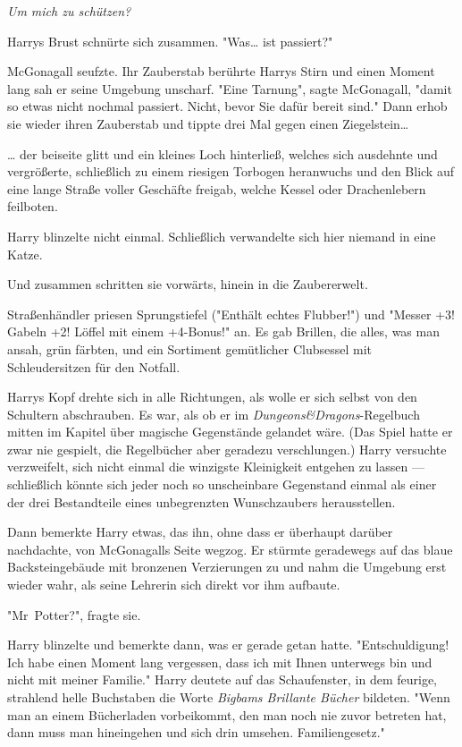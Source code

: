 {\emph{Um mich zu schützen?}

Harrys Brust schnürte sich zusammen. "Was… ist passiert?"

McGonagall seufzte. Ihr Zauberstab berührte Harrys Stirn und einen Moment lang sah er seine Umgebung unscharf. "Eine Tarnung", sagte McGonagall, "damit so etwas nicht nochmal passiert. Nicht, bevor Sie dafür bereit sind." Dann erhob sie wieder ihren Zauberstab und tippte drei Mal gegen einen Ziegelstein…

… der beiseite glitt und ein kleines Loch hinterließ, welches sich ausdehnte und vergrößerte, schließlich zu einem riesigen Torbogen heranwuchs und den Blick auf eine lange Straße voller Geschäfte freigab, welche Kessel oder Drachenlebern feilboten.

Harry blinzelte nicht einmal. Schließlich verwandelte sich hier niemand in eine Katze.

Und zusammen schritten sie vorwärts, hinein in die Zaubererwelt.

Straßenhändler priesen Sprungstiefel ("Enthält echtes Flubber!") und "Messer +3! Gabeln +2! Löffel mit einem +4-Bonus!" an. Es gab Brillen, die alles, was man ansah, grün färbten, und ein Sortiment gemütlicher Clubsessel mit Schleudersitzen für den Notfall.

Harrys Kopf drehte sich in alle Richtungen, als wolle er sich selbst von den Schultern abschrauben. Es war, als ob er im \emph{Dungeons\&Dragons}-Regelbuch mitten im Kapitel über magische Gegenstände gelandet wäre. (Das Spiel hatte er zwar nie gespielt, die Regelbücher aber geradezu verschlungen.) Harry versuchte verzweifelt, sich nicht einmal die winzigste Kleinigkeit entgehen zu lassen --- schließlich könnte sich jeder noch so unscheinbare Gegenstand einmal als einer der drei Bestandteile eines unbegrenzten Wunschzaubers herausstellen.

Dann bemerkte Harry etwas, das ihn, ohne dass er überhaupt darüber nachdachte, von McGonagalls Seite wegzog. Er stürmte geradewegs auf das blaue Backsteingebäude mit bronzenen Verzierungen zu und nahm die Umgebung erst wieder wahr, als seine Lehrerin sich direkt vor ihm aufbaute.

"Mr~Potter?", fragte sie.

Harry blinzelte und bemerkte dann, was er gerade getan hatte. "Entschuldigung! Ich habe einen Moment lang vergessen, dass ich mit Ihnen unterwegs bin und nicht mit meiner Familie." Harry deutete auf das Schaufenster, in dem feurige, strahlend helle Buchstaben die Worte \emph{Bigbams Brillante Bücher} bildeten. "Wenn man an einem Bücherladen vorbeikommt, den man noch nie zuvor betreten hat, dann muss man hineingehen und sich drin umsehen. Familiengesetz."

}
